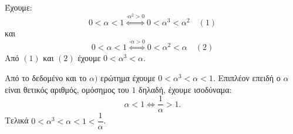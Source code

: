 
\begin{alist}
\item Έχουμε:
\[0 < \alpha < 1 \stackrel{\cdot \alpha^2 > 0}{\Leftrightarrow} 0 < \alpha^3 < \alpha^2 \quad (1)\]
και
\[0 < \alpha < 1 \stackrel{\cdot \alpha > 0}{\Leftrightarrow} 0 < \alpha^2 < \alpha \quad (2)\]
Από $(1)$ και $(2)$ έχουμε $0 < \alpha^3 < \alpha$.

\item Από το δεδομένο και το $\alpha)$ ερώτημα έχουμε $0 < \alpha^3 < \alpha < 1$. Επιπλέον επειδή ο $\alpha$ 
είναι θετικός αριθμός, ομόσημος του $1$ δηλαδή, έχουμε ισοδύναμα:
\[\alpha < 1 \Leftrightarrow \dfrac{1}{\alpha} > 1.\]
Τελικά $0 < \alpha^3 < \alpha < 1 < \dfrac{1}{\alpha}$.
\end{alist}


